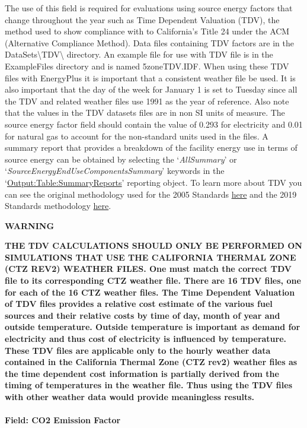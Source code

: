 The use of this field is required for evaluations using source energy factors that change throughout the year such as Time Dependent Valuation (TDV), the method used to show compliance with to California's Title 24 under the ACM (Alternative Compliance Method). Data files containing TDV factors are in the DataSets\textbackslash{}TDV\textbackslash{} directory. An example file for use with TDV file is in the ExampleFiles directory and is named 5zoneTDV.IDF. When using these TDV files with EnergyPlus it is important that a consistent weather file be used. It is also important that the day of the week for January 1 is set to Tuesday since all the TDV and related weather files use 1991 as the year of reference. Also note that the values in the TDV datasets files are in non SI units of measure. The source energy factor field should contain the value of 0.293 for electricity and 0.01 for natural gas to account for the non-standard units used in the files. A summary report that provides a breakdown of the facility energy use in terms of source energy can be obtained by selecting the `\emph{AllSummary}' or `\emph{SourceEnergyEndUseComponentsSummary}' keywords in the `\hyperref[outputtablesummaryreports]{Output:Table:SummaryReports}' reporting object. To learn more about TDV you can see the original methodology used for the 2005 Standards \href{http://h-m-g.com/TDV/}{here} and the 2019 Standards methodology \href{https://www.ethree.com/wp-content/uploads/2017/01/TN212524_20160801T120224_2019_TDV_Methodology_Report_7222016.pdf}{here}.

\textbf{WARNING}

\textbf{THE TDV CALCULATIONS SHOULD ONLY BE PERFORMED ON SIMULATIONS THAT USE THE CALIFORNIA THERMAL ZONE (CTZ REV2) WEATHER FILES. One must match the correct TDV file to its corresponding CTZ weather file. There are 16 TDV files, one for each of the 16 CTZ weather files. The Time Dependent Valuation of TDV files provides a relative cost estimate of the various fuel sources and their relative costs by time of day, month of year and outside temperature. Outside temperature is important as demand for electricity and thus cost of electricity is influenced by temperature. These TDV files are applicable only to the hourly weather data contained in the California Thermal Zone (CTZ rev2) weather files as the time dependent cost information is partially derived from the timing of temperatures in the weather file. Thus using the TDV files with other weather data would provide meaningless results.}

\paragraph{Field: CO2 Emission Factor}\label{field-co2-emission-factor}

